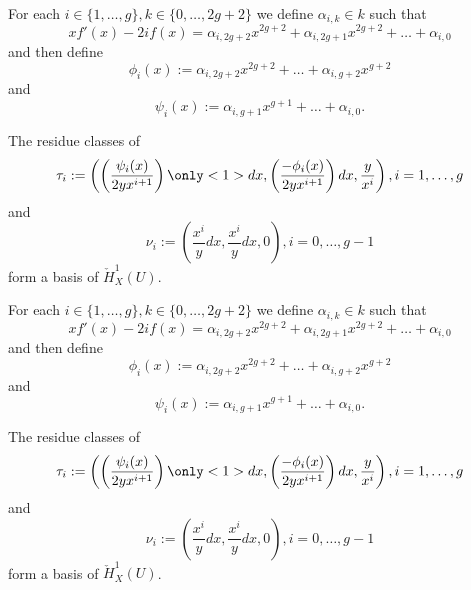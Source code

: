 \documentclass{beamer}
\begin{document}



\begin{frame}
For each $i \in \{1, \ldots, g\}, k \in \{0, \ldots , 2g+2\}$ we define $\alpha_{i,k}\in k$ such that
\[
xf'(x) - 2if(x) = \alpha_{i,2g+2}x^{2g+2} + \alpha_{i, 2g+1}x^{2g+2} + \ldots + \alpha_{i,0}
\]
and then define
\[
\phi_i(x)  := \alpha_{i,2g+2}x^{2g+2} + \ldots + \alpha_{i,g+2}x^{g+2} 
\]
and
\[
\psi_i(x) := \alpha_{i,g+1}x^{g+1} + \ldots + \alpha_{i,0}.
\]
\pause
\begin{theorem}
The residue classes of
\[
\tau_i := \left( \left( \frac{\psi_i(x)}{2yx^{i+1}} \right) \only<1>{dx}, \left(\frac{-\phi_i(x)}{2yx^{i+1}} \right)dx, \frac{y}{x^i} \right), i= 1, \ldots, g
\]
and
\[
\nu_i := \left( \frac{x^i}{y}dx, \frac{x^i}{y}dx, 0 \right), i = 0, \ldots, g-1
\]
form a basis of $\check{H}^1_X(U)$.
\end{theorem}
\end{frame}




\begin{frame}
For each $i \in \{1, \ldots, g\}, k \in \{0, \ldots , 2g+2\}$ we define $\alpha_{i,k}\in k$ such that
\[
xf'(x) - 2if(x) = \alpha_{i,2g+2}x^{2g+2} + \alpha_{i, 2g+1}x^{2g+2} + \ldots + \alpha_{i,0}
\]
and then define
\[
\phi_i(x)  := \alpha_{i,2g+2}x^{2g+2} + \ldots + \alpha_{i,g+2}x^{g+2} 
\]
and
\[
\psi_i(x) := \alpha_{i,g+1}x^{g+1} + \ldots + \alpha_{i,0}.
\]
\pause
\begin{theorem}
The residue classes of
\[
\tau_i := \left( \left( \frac{\psi_i(x)}{2yx^{i+1}} \right) \only<1>{dx}, \left(\frac{-\phi_i(x)}{2yx^{i+1}} \right)dx, \frac{y}{x^i} \right), i= 1, \ldots, g
\]
and
\[
\nu_i := \left( \frac{x^i}{y}dx, \frac{x^i}{y}dx, 0 \right), i = 0, \ldots, g-1
\]
form a basis of $\check{H}^1_X(U)$.
\end{theorem}
\end{frame}
\end{document}

